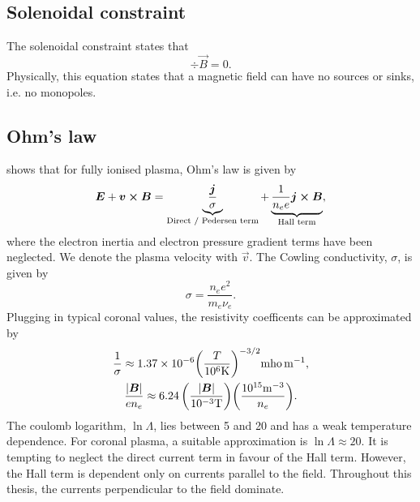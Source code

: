 
\subsection{Solenoidal constraint}

The solenoidal constraint states that
\begin{equation}
    \div{\vec{B}}=0.
\end{equation}
Physically, this equation states that a magnetic field can have no sources or sinks, i.e. no monopoles.

\subsection{Ohm's law}

\citet{Priest2014} shows that for fully ionised plasma, Ohm's law is given by
\begin{equation}
    \label{eq:ohms_law}
    \vec{E}+\vec{v}\cross\vec{B}=\underbrace{\frac{\vec{j}}{\sigma}}_{\text{Direct / Pedersen term}}+\underbrace{\frac{1}{n_ee}\vec{j}\cross\vec{B}}_{\text{Hall term}},
\end{equation}
where the electron inertia and electron pressure gradient terms have been neglected. We denote the plasma velocity with $\vec{v}$. The Cowling conductivity, $\sigma$, is given by
\begin{equation}
    \sigma = \frac{n_ee^2}{m_e\nu_e}.
\end{equation}
Plugging in typical coronal values, the resistivity coefficents can be approximated by
\begin{gather}
    \frac{1}{\sigma}\approx1.37\times10^{-6}\qty(\frac{T}{10^6\si{.K}})^{-3/2}\si{.mho.m^{-1}},  \\
    \frac{\abs{\vec{B}}}{en_e}\approx6.24\,\qty(\frac{\abs{\vec{B}}}{10^{-3}\si{.T}})\qty(\frac{10^{15}\si{.m^{-3}}}{n_e}).
\end{gather}
The coulomb logarithm, $\ln\Lambda$, lies between 5 and 20 and has a weak temperature dependence. For coronal plasma, a suitable approximation is $\ln\Lambda\approx20$. It is tempting to neglect the direct current term in favour of the Hall term. However, the Hall term is dependent only on currents parallel to the field. Throughout this thesis, the currents perpendicular to the field dominate.

